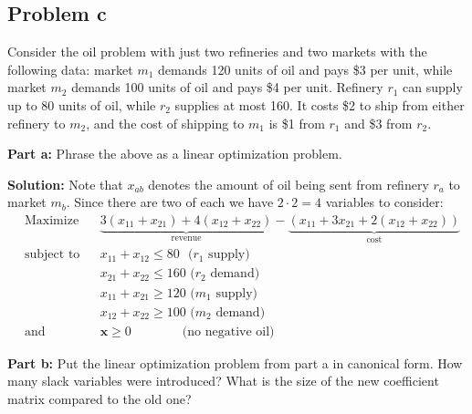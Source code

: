 \documentclass{article}
\renewcommand\vec{\mathbf}
\begin{document}
\subsection*{Problem c}
Consider the oil problem with just two refineries and two markets with the following data: market $m_1$ demands 120 units of oil and pays \$3 per unit, while market $m_2$ demands 100 units of oil and pays \$4 per unit. Refinery $r_1$ can supply up to 80 units of oil, while $r_2$ supplies at most 160. It costs \$2 to ship from either refinery to $m_2$, and the cost of shipping to $m_1$ is \$1 from $r_1$ and \$3 from $r_2$.
\bigskip

\noindent\textbf{Part a:} Phrase the above as a linear optimization problem.
\bigskip

\noindent\textbf{Solution:} Note that $x_{ab}$ denotes the amount of oil being sent from refinery $r_a$ to market $m_b$. Since there are two of each we have $2\cdot2=4$ variables to consider: 
$$\begin{aligned}
    &{\text{Maximize}}
    &&\underbrace{3(x_{11}+x_{21})+4(x_{12}+x_{22})}_{\text{revenue}}-\underbrace{(x_{11}+3x_{21}+2(x_{12}+x_{22}))}_{\text{cost}} \\
    &{\text{subject to}}
    &&x_{11}+x_{12}\le80\,\,\,\,\text{($r_1$ supply)}\\
    &
    &&x_{21}+x_{22}\le160\,\,\text{($r_2$ demand)}\\
    &
    &&x_{11}+x_{21}\ge120\,\,\text{($m_1$ supply)}\\
    &
    &&x_{12}+x_{22}\ge100\,\,\text{($m_2$ demand)}\\
    &{\text{and}}
    &&\vec x\ge 0\qquad\qquad\text{(no negative oil)}
\end{aligned}$$
\bigskip

\noindent\textbf{Part b:} Put the linear optimization problem from part a in canonical form. How many slack variables were introduced? What is the size of the new coefficient matrix compared to the old one?
\bigskip
\end{document}
